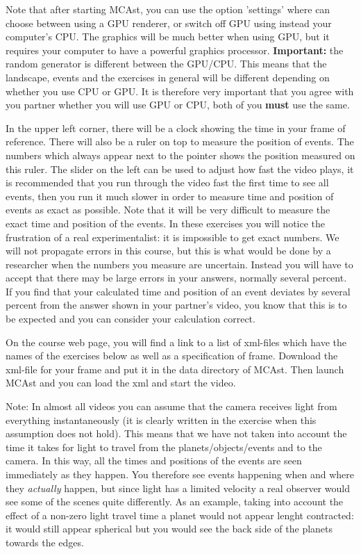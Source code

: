 {\begin{multicols}{2}
Note that after starting MCAst, you can use the option 'settings' where can choose between using a GPU renderer, or switch off GPU using instead your computer's CPU. The graphics will be much better when using GPU, but it requires your computer to have a powerful graphics processor. {\bf Important:} the random generator is different between the GPU/CPU. This means that the landscape, events and the exercises in general will be different depending on whether you use CPU or GPU. It is therefore very important that you agree with you partner whether you will use GPU or CPU, both of you {\bf must} use the same.

In the upper left corner, there will be a clock showing the time in your frame of reference. There will also be a ruler on top to measure the position of events. The numbers which always appear next to the pointer shows the position measured on this ruler. The slider on the left can be used to adjust how fast the video plays, it is recommended that you run through the video fast the first time to see all events, then you run it much slower in order to measure time and position of events as exact as possible. Note that it will be very difficult to measure the exact time and position of the events. In these exercises you will notice the frustration of a real experimentalist: it is impossible to get exact numbers. We will not propagate errors in this course, but this is what would be done by a researcher when the numbers you measure are uncertain. Instead you will have to accept that there may be large errors in your answers, normally several percent. If you find that your calculated time and position of an event deviates by several percent from the answer shown in your partner's video, you know that this is to be expected and you can consider your calculation correct.

On the course web page, you will find a link to a list of xml-files which have the names of the exercises below as well as a specification of frame. Download the xml-file for your frame and put it in the data directory of MCAst. Then launch MCAst and you can load the xml and start the video.

Note: In almost all videos you can assume that the camera receives light from everything instantaneously (it is clearly written in the exercise when this assumption does not hold). This means that we have not taken into account the time it takes for light to travel from the planets/objects/events and to the camera. In this way, all the times and positions of the events are seen immediately as they happen. You therefore see events happening when and where they {\it actually} happen, but since light has a limited velocity a real observer would see some of the scenes quite differently. As an example, taking into account the effect of a non-zero light travel time a planet would not appear lenght contracted: it would still appear spherical but you would see the back side of the planets towards the edges.



\end{multicols}}
